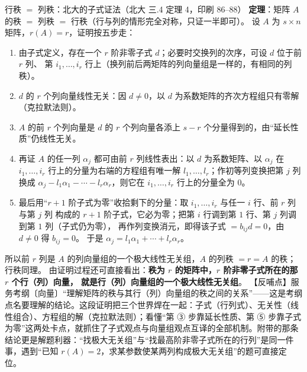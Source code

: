 \begin{fdeep}{行秩 $=$ 列秩：北大的子式证法（北大 三.4 定理 4，印刷 86--88）}
\textbf{定理}：矩阵 $A$ 的秩 $=$ 列秩 $=$ 行秩（行与列的情形完全对称，只证一半即可）。
设 $A$ 为 $s\times n$ 矩阵，$r(A)=r$，证明按五步走：
\begin{enumerate}[leftmargin=2.2em,itemsep=0.22em]
\item 由子式定义，存在一个 $r$ 阶非零子式 $d$；必要时交换列的次序，可设 $d$ 位于前 $r$ 列、
      第 $i_1,\dots,i_r$ 行上（换列前后两矩阵的列向量组是一样的，有相同的列秩）。
\item $d$ 的 $r$ 个列向量线性无关：因 $d\ne0$，以 $d$ 为系数矩阵的齐次方程组只有零解（克拉默法则）。
\item $A$ 的前 $r$ 个列向量是 $d$ 的 $r$ 个列向量各添上 $s-r$ 个分量得到的，由“延长性质”仍线性无关。
\item 再证 $A$ 的任一列 $\alpha_j$ 都可由前 $r$ 列线性表出：以 $d$ 为系数矩阵、以 $\alpha_j$ 在
      $i_1,\dots,i_r$ 行上的分量为右端的方程组有唯一解 $l_1,\dots,l_r$；作初等列变换把第 $j$ 列换成
      $\alpha_j-l_1\alpha_1-\cdots-l_r\alpha_r$，则它在 $i_1,\dots,i_r$ 行上的分量全为 $0$。
\item 最后用“$r+1$ 阶子式为零”收拾剩下的分量：取 $i_1,\dots,i_r$ 与任一 $i$ 行、前 $r$ 列与第 $j$ 列
      构成的 $r+1$ 阶子式，它必为零；把第 $i$ 行调到第 $1$ 行、第 $j$ 列调到第 $1$ 列（子式仍为零），
      再作列变换消元，即得该子式 $=b_{ij}d=0$，由 $d\ne0$ 得 $b_{ij}=0$。
      于是 $\alpha_j=l_1\alpha_1+\cdots+l_r\alpha_r$。
\end{enumerate}
所以前 $r$ 列是 $A$ 的列向量组的一个极大线性无关组，$A$ 的列秩 $=r=A$ 的秩；行秩同理。
由证明过程还可直接看出：\textbf{秩为 $r$ 的矩阵中，$r$ 阶非零子式所在的那 $r$ 个行（列）向量，
就是行（列）向量组的一个极大线性无关组}。
【反哺点】服务考纲〔向量〕“理解矩阵的秩与其行（列）向量组的秩之间的关系”——这是考纲点名要理解的结论。这段证明把三个世界焊在一起：子式（行列式）、无关性（线性组合）、方程组的解（克拉默法则）；看懂“第 ③ 步靠延长性质、第 ⑤ 步靠子式为零”这两处卡点，就抓住了子式观点与向量组观点互译的全部机制。附带的那条结论更是解题利器：“找极大无关组”与“找最高阶非零子式所在的行列”是同一件事，遇到“已知 $r(A)=2$，求某参数使某两列构成极大无关组”的题可直接定位。
\end{fdeep}

